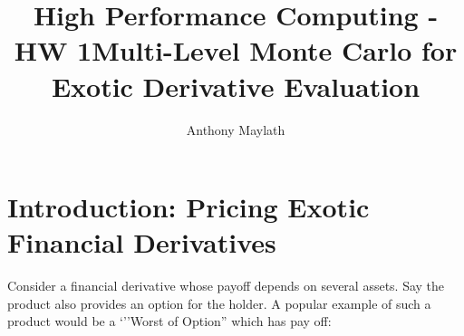\documentclass[12pt]{article}
\title{High Performance Computing - HW 1}
\author{Anthony Maylath}
\begin{document}

\setcounter{MaxMatrixCols}{13}

\title{Multi-Level Monte Carlo for Exotic Derivative Evaluation}

\maketitle


\section{Introduction: Pricing Exotic Financial Derivatives}

Consider a financial derivative whose payoff depends on several assets. Say the product also provides an option for the holder. A popular example of such a product would be a `''Worst of Option'' which has pay off:
\end{document}
